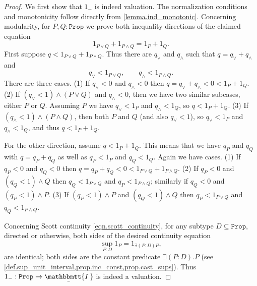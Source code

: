 \documentclass[11pt, oneside, article]{memoir}
\theoremstyle{plain}
\theoremstyle{definition}
\theoremstyle{remark}
\renewcommand{\ss}{\subseteq}
\newcommand{\const}[1]{\mathtt{#1}}
\newcommand{\ubar}[1]{\underaccent{\bar}{#1}}
\newcommand{\ind}[1]{1_{#1}}
\newcommand{\inc}{\ind{-}}				%
\newcommand{\internal}[1]{\raisebox{-.03ex}{$\mathbbmtt{#1}$}}
\newcommand{\hs}{\hspace{1.1pt}}
\newcommand{\tii}{\ubar{\internal{I\hs\hs}}\!\hs}
\newcommand{\prop}{\const{Prop}}
\begin{document}
\begin{proof}
	We first show that $\inc$ is indeed valuation. The normalization conditions and monotonicity follow directly from \cref{lemma.ind_monotonic}. 	Concerning modularity, for $P,Q : \prop$ we prove both inequality directions of the claimed equation
	\[
		\ind{P \lor Q} + \ind{P \land Q} = \ind P + \ind Q.
	\]
	First suppose $q < \ind{P \lor Q} + \ind{P \land Q}$. Thus there are $q_\lor$ and $q_\land$ such that $q = q_\lor + q_\land$ and
	\[
		q_\lor < \ind{P \lor Q}, \qquad q_\land < \ind{P \land Q}.
	\]
	There are three cases. (1) If $q_\vee<0$ and $q_\wedge<0$ then $q=q_\vee+q_\wedge<0<\ind P + \ind Q$. (2) If  $(q_\vee<1)\wedge(P\vee Q)$ and $q_\wedge<0$, then we have two similar subcases, either $P$ or $Q$. Assuming $P$ we have $q_\vee<\ind P$ and $q_\wedge<\ind Q$, so $q<\ind P+\ind Q$. (3) If $(q_\wedge<1)\wedge(P\wedge Q)$, then both $P$ and $Q$ (and also $q_\vee<1$), so $q_\vee<\ind P$ and $q_\wedge<\ind Q$, and thus $q<\ind P + \ind Q$.
	
	For the other direction, assume $q < \ind{P} + \ind{Q}$. This means that we have $q_P$ and $q_Q$ with $q = q_P + q_Q$ as well as $q_P < \ind{P}$ and $q_Q < \ind{Q}$. Again we have cases. (1) If $q_P<0$ and $q_Q<0$ then $q=q_P + q_Q<0<\ind{P \lor Q} + \ind{P \land Q}$. (2) If $q_P<0$ and $(q_Q<1)\wedge Q$ then $q_Q<\ind{P\vee Q}$ and $q_P<\ind{P\wedge Q}$; similarly if $q_Q<0$ and $(q_P<1)\wedge P$. (3) If $(q_P<1)\wedge P$ and $(q_Q<1)\wedge Q$ then $q_P<\ind{P\vee Q}$ and $q_Q<\ind{P\wedge Q}$.
	
	

	Concerning Scott continuity \eqref{eqn.scott_continuity}, for any subtype $D \ss \prop$, directed or otherwise, both sides of the desired continuity equation
	\[
		\sup_{P : D} \ind{P} = \ind{\exists (P:D) P},
	\]
	are identical; both sides are the constant predicate $\exists(P:D).P$ (see \cref{def.sup_unit_interval,prop.inc_const,prop.cast_sups}). Thus $\inc : \prop \to \tii$ is indeed a valuation.
\end{proof}
\end{document}
